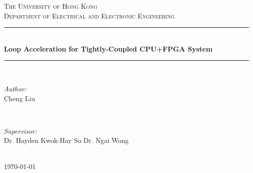 \documentclass[12pt]{article} %
\begin{document}

\begin{titlepage}

\newcommand{\HRule}{\rule{\linewidth}{0.5mm}} %

\center %

\textsc{\LARGE The University of Hong Kong}\\[1.5cm] %
\textsc{\Large Department of Electrical and Electronic Engineering}\\[0.5cm] %

\HRule \\[0.4cm]
{ \huge \bfseries Loop Acceleration for Tightly-Coupled CPU+FPGA System}\\[0.4cm] %
\HRule \\[1.5cm]

\begin{minipage}{0.4\textwidth}
\begin{flushleft} \large
\emph{Author:}\\
Cheng Liu %
\end{flushleft}
\end{minipage}
~
\begin{minipage}{0.4\textwidth}
\begin{flushright} \large
\emph{Supervisor:} \\
Dr. Hayden Kwok-Hay So
Dr. Ngai Wong  %
\end{flushright}
\end{minipage}\\[4cm]

{\large \today}\\[3cm] %

\vfill %

\end{titlepage}


\tableofcontents %
\end{document}
